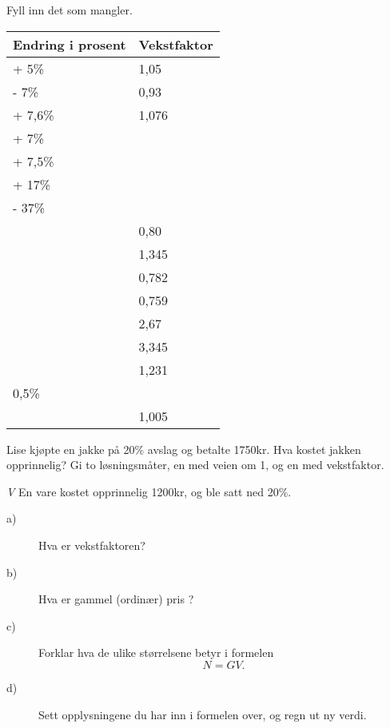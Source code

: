 \documentclass[a4, 11pt, twoside]{article}
\theoremstyle{definition}
\begin{document}
\begin{Exercise}
Fyll inn det som mangler.
\newline
\begin{center}
\begin{tabular}{| l | l |}
\hline
\textbf{Endring i prosent} & \textbf{Vekstfaktor} \\ \hline  
+ 5\%                      & 1,05                 \\ \hline 
- 7\%                      & 0,93                 \\ \hline 
+ 7,6\%                    & 1,076                \\ \hline 
+ 7\%                      &                      \\ \hline 
+ 7,5\%                    &                      \\ \hline 
+ 17\%                     &                      \\ \hline 
- 37\%                     &                      \\ \hline 
                           & 0,80                 \\ \hline 
                           & 1,345                \\ \hline 
                           & 0,782                \\ \hline 
                           & 0,759                \\ \hline 
                           & 2,67                 \\ \hline 
                           & 3,345                 \\ \hline 
                           & 1,231                 \\ \hline 
0,5\%                      &                      \\ \hline
                           & 1,005                 \\ \hline 
\end{tabular}
\end{center}
\end{Exercise}

\begin{Exercise}\label{anbefalt3}
Lise kjøpte en jakke på 20\% avslag og betalte 1750kr.
Hva kostet jakken opprinnelig? Gi to løsningsmåter, en med
veien om 1, og en med vekstfaktor.
\end{Exercise}

\begin{Exercise}
\textit{V}\newline
  En vare kostet opprinnelig 1200kr, og ble satt ned 20\%. 
\begin{description}
  \item[a)] Hva er vekstfaktoren?
  \item[b)] Hva er gammel (ordinær) pris ?
  \item[c)] Forklar hva de ulike størrelsene betyr i formelen \[N = GV.\]
  \item[d)] Sett opplysningene du har inn i formelen over, og regn ut ny verdi.
\end{description}
\end{Exercise}
\end{document}
